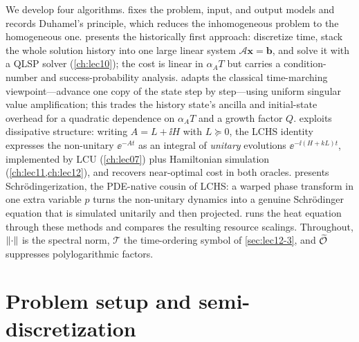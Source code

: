We develop four algorithms.  fixes the problem, input, and output models and
records Duhamel's principle, which reduces the inhomogeneous problem to the homogeneous one.
 presents the historically first approach: discretize time, stack the whole
solution history into one large linear system $\mathcal A\mathbf x=\mathbf b$, and solve it with a
QLSP solver (\cref{ch:lec10}); the cost is linear in $\alpha_A T$ but carries a condition-number
and success-probability analysis.  adapts the classical time-marching
viewpoint---advance one copy of the state step by step---using uniform singular value
amplification; this trades the history state's ancilla and initial-state overhead for a
quadratic dependence on $\alpha_A T$ and a growth factor $Q$.  exploits
dissipative structure: writing $A=L+\ii H$ with $L\succeq0$, the LCHS identity expresses the
non-unitary $\ee^{-At}$ as an integral of \emph{unitary} evolutions $\ee^{-\ii(H+kL)t}$,
implemented by LCU (\cref{ch:lec07}) plus Hamiltonian simulation (\cref{ch:lec11,ch:lec12}), and
recovers near-optimal cost in both oracles.  presents Schr\"odingerization,
the PDE-native cousin of LCHS: a warped phase transform in one extra variable $p$ turns the
non-unitary dynamics into a genuine Schr\"odinger equation that is simulated unitarily and then
projected.  runs the heat equation through these methods and compares the
resulting resource scalings. Throughout, $\left\lVert \cdot \right\rVert$ is the spectral norm, $\mathcal T$ the
time-ordering symbol of \cref{sec:lec12-3}, and $\widetilde{\mathcal{O}}$ suppresses polylogarithmic
factors.

\section{Problem setup and semi-discretization}
\label{sec:lec13-1}

